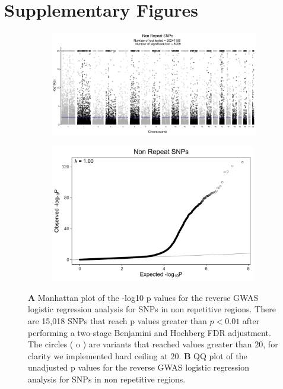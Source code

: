 \documentclass[9pt,lineno]{elife}
\begin{document}


\clearpage
\section{Supplementary Figures}

\renewcommand{\thefigure}{S\arabic{figure}}
\setcounter{figure}{0}   	

\begin{figure} \centering
    \begin{subfigure}[b]{\linewidth}
        \includegraphics[width=\hsize]{./Figures/ManhattanPlot_NORepeat_SNPs.jpg}
        \label{fig:a}
    \end{subfigure} %

    \begin{subfigure}[b]{\linewidth}
    	\center    
        \includegraphics[width=90mm]{./Figures/NORepeat_SNPs_QQ.jpg}
        \label{fig:b}    
    \end{subfigure} 
    \caption{\textbf{A} Manhattan plot of the -log10 p values for the reverse GWAS logistic regression analysis for SNPs in non repetitive regions. There are 15,018 SNPs that reach p values greater than $ p < 0.01$ after performing a two-stage Benjamini and Hochberg FDR adjustment.  The circles ( o ) are variants that reached values greater than 20, for clarity we implemented hard ceiling at 20. 
  \textbf{B} QQ plot of the unadjusted p values for the reverse GWAS logistic regression analysis for SNPs in non repetitive regions.}
  \label{NRS_Manhattan}
  \end{figure}
\end{document}
